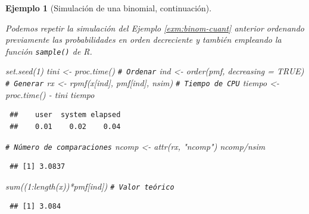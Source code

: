 \documentclass[
  10pt,
]{book}
\newenvironment{Shaded}{\begin{snugshade}}{\end{snugshade}}
\newcommand{\AttributeTok}[1]{\textcolor[rgb]{0.77,0.63,0.00}{#1}}
\newcommand{\CommentTok}[1]{\textcolor[rgb]{0.56,0.35,0.01}{\textit{#1}}}
\newcommand{\ConstantTok}[1]{\textcolor[rgb]{0.00,0.00,0.00}{#1}}
\newcommand{\DecValTok}[1]{\textcolor[rgb]{0.00,0.00,0.81}{#1}}
\newcommand{\FunctionTok}[1]{\textcolor[rgb]{0.00,0.00,0.00}{#1}}
\newcommand{\NormalTok}[1]{#1}
\newcommand{\OtherTok}[1]{\textcolor[rgb]{0.56,0.35,0.01}{#1}}
\newcommand{\SpecialCharTok}[1]{\textcolor[rgb]{0.00,0.00,0.00}{#1}}
\newcommand{\StringTok}[1]{\textcolor[rgb]{0.31,0.60,0.02}{#1}}
\theoremstyle{break}
\newtheorem{example}{Ejemplo}[chapter]
\theoremstyle{nonumberplain}
\renewcommand{\CommentTok}[1]{\textcolor[rgb]{0.41,0.41,0.41}{\texttt{#1}}}
\begin{document}
\begin{example}[Simulación de una binomial, continuación]
\protect\hypertarget{exm:binom-cuantb}{}\label{exm:binom-cuantb}

Podemos repetir la simulación del Ejemplo \ref{exm:binom-cuant} anterior ordenando previamente las probabilidades en orden decreciente y también empleando la función \texttt{sample()} de R.

\begin{Shaded}
\begin{Highlighting}[]
\FunctionTok{set.seed}\NormalTok{(}\DecValTok{1}\NormalTok{)}
\NormalTok{tini }\OtherTok{\textless{}{-}} \FunctionTok{proc.time}\NormalTok{()}
\CommentTok{\# Ordenar}
\NormalTok{ind }\OtherTok{\textless{}{-}} \FunctionTok{order}\NormalTok{(pmf, }\AttributeTok{decreasing =} \ConstantTok{TRUE}\NormalTok{)}
\CommentTok{\# Generar}
\NormalTok{rx }\OtherTok{\textless{}{-}} \FunctionTok{rpmf}\NormalTok{(x[ind], pmf[ind], nsim)}
\CommentTok{\# Tiempo de CPU}
\NormalTok{tiempo }\OtherTok{\textless{}{-}} \FunctionTok{proc.time}\NormalTok{() }\SpecialCharTok{{-}}\NormalTok{ tini}
\NormalTok{tiempo}
\end{Highlighting}
\end{Shaded}

\begin{verbatim}
 ##    user  system elapsed 
 ##    0.01    0.02    0.04
\end{verbatim}

\begin{Shaded}
\begin{Highlighting}[]
\CommentTok{\# Número de comparaciones}
\NormalTok{ncomp }\OtherTok{\textless{}{-}} \FunctionTok{attr}\NormalTok{(rx, }\StringTok{"ncomp"}\NormalTok{)}
\NormalTok{ncomp}\SpecialCharTok{/}\NormalTok{nsim}
\end{Highlighting}
\end{Shaded}

\begin{verbatim}
 ## [1] 3.0837
\end{verbatim}

\begin{Shaded}
\begin{Highlighting}[]
\FunctionTok{sum}\NormalTok{((}\DecValTok{1}\SpecialCharTok{:}\FunctionTok{length}\NormalTok{(x))}\SpecialCharTok{*}\NormalTok{pmf[ind]) }\CommentTok{\# Valor teórico}
\end{Highlighting}
\end{Shaded}

\begin{verbatim}
 ## [1] 3.084
\end{verbatim}


\end{example}
\end{document}

